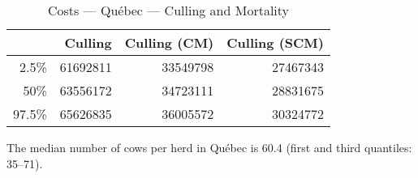 \documentclass{article}\usepackage[]{graphicx}\usepackage[]{color}
\begin{document}
\begin{table}[ht]
\centering
\begin{tabular}{rrrr}
  \hline
 & Culling & Culling (CM) & Culling (SCM) \\ 
  \hline
2.5\% & 61692811 & 33549798 & 27467343 \\ 
  50\% & 63556172 & 34723111 & 28831675 \\ 
  97.5\% & 65626835 & 36005572 & 30324772 \\ 
   \hline
\end{tabular}
\caption{Costs --- Québec --- Culling and Mortality} 
\label{tab:quebec:c}
\end{table}


The median number of cows per herd in Québec is 60.4 (first
and third quantiles: 35--71).
\clearpage
\end{document}
